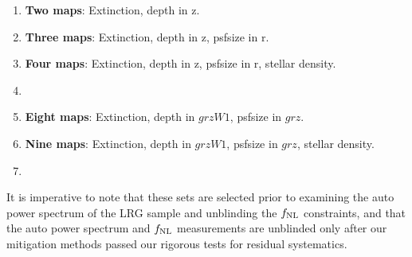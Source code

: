 \begin{enumerate}[itemindent=*]
\item \textbf{Two maps}: Extinction, depth in z.
\item \textbf{Three maps}: Extinction, depth in z, psfsize in r.
\item \textbf{Four maps}: Extinction, depth in z, psfsize in r, stellar density.
\item {}
\item \textbf{Eight maps}: Extinction, depth in $grzW1$, psfsize in $grz$.
\item \textbf{Nine maps}: Extinction, depth in $grzW1$, psfsize in $grz$, stellar density.
\item {}
\end{enumerate}
It is imperative to note that these sets are selected prior to examining the auto power spectrum of the LRG sample and unblinding the $f_{\rm NL}$ constraints, and that the auto power spectrum and $f_{\rm NL}$ measurements are unblinded only after our mitigation methods passed our rigorous tests for residual systematics.

